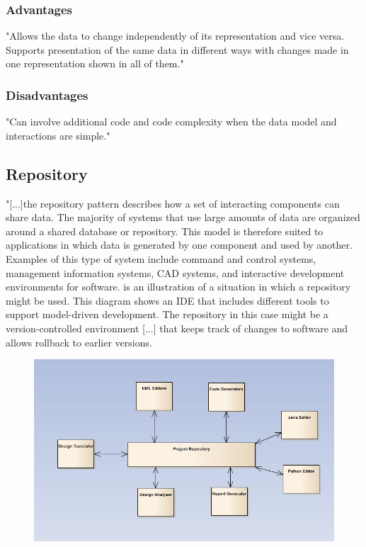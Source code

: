 \subsubsection{Advantages}
"Allows the data to change independently of its representation and vice versa. Supports presentation of the same data in different ways with changes made in one representation shown in all of them."\citep{sommerville}
\subsubsection{Disadvantages}
"Can involve additional code and code complexity when the data model and interactions are simple."\citep{sommerville}


\pagebreak

\subsection{Repository}
"[...]the repository pattern  describes how a set of interacting components can share data. The majority of systems that use large amounts of data are organized around a shared database or repository. This model is therefore suited to applications in which data is generated by one component and used by another. Examples of this type of system include command and control systems, management information systems, CAD systems, and interactive development environments for software.
 is an illustration of a situation in which a repository might be used. This diagram shows an IDE that includes different tools to support model-driven development. The repository in this case might be a version-controlled environment [...] that keeps track of changes to software and allows rollback to earlier versions.
\begin{figure}[!hbp]
\includegraphics[scale=0.85]{img/pics/Repository.PNG}
\caption{ \protect \cite{sommerville}}
\label{fig:ref_repo}
\end{figure}
